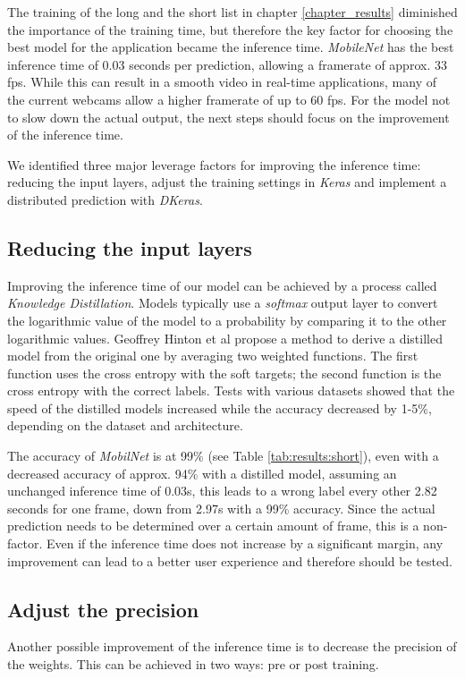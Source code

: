 The training of the long and the short list in chapter \ref{chapter_results} diminished the importance of the training time, but therefore the key factor for choosing the best model for the application became the inference time. \textit{MobileNet} has the best inference time of 0.03 seconds per prediction, allowing a framerate of approx. 33 fps. While this can result in a smooth video in real-time applications, many of the current webcams allow a higher framerate of up to 60 fps. For the model not to slow down the actual output, the next steps should focus on the improvement of the inference time.

We identified three major leverage factors for improving the inference time: reducing the input layers, adjust the training settings in \textit{Keras} and implement a distributed prediction with \textit{DKeras}.

\subsection{Reducing the input layers}\label{chapter_distill}
Improving the inference time of our model can be achieved by a process called \textit{Knowledge Distillation}\cite{hinton2015distilling}. Models typically use a \textit{softmax} output layer to convert the logarithmic value of the model to a probability by comparing it to the other logarithmic values. Geoffrey Hinton et al\cite{hinton2015distilling} propose a method to derive a distilled model from the original one by averaging two weighted functions. The first function uses the cross entropy with the soft targets; the second function is the cross entropy with the correct labels. Tests with various datasets showed that the speed of the distilled models increased while the accuracy decreased by 1-5\%, depending on the dataset and architecture.

The accuracy of \textit{MobilNet} is at 99\% (see Table \ref{tab:results:short}), even with a decreased accuracy of approx. 94\% with a distilled model, assuming an unchanged inference time of 0.03s, this leads to a wrong label every other 2.82 seconds for one frame, down from 2.97s with a 99\% accuracy. Since the actual prediction needs to be determined over a certain amount of frame, this is a non-factor. Even if the inference time does not increase by a significant margin, any improvement can lead to a better user experience and therefore should be tested.

\subsection{Adjust the precision}
Another possible improvement of the inference time is to decrease the precision of the weights. This can be achieved in two ways: pre or post training.

